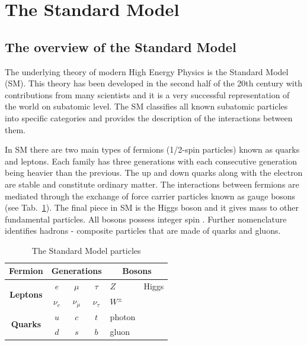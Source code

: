 \section{The Standard Model}
\label{SM}
\subsection{The overview of the Standard Model}
The underlying theory of modern High Energy Physics is the Standard Model (SM). This theory has been developed in the second half of the 20th century with contributions from many scientists and it is a very successful representation of the world on subatomic level.
The SM classifies all known subatomic particles into specific categories and provides the description of the interactions between them. 

In SM there are two main types of fermions (1/2-spin particles) known as quarks and leptons. Each family has three generations with each consecutive generation being heavier than the previous. The up and down quarks along with the electron are stable and constitute ordinary matter. The interactions between fermions are mediated through the exchange of force carrier particles known as gauge bosons (see Tab.~\ref{tab:SM}). The final piece in SM is the Higgs boson and it gives mass to other fundamental particles. All bosons possess integer spin \citep{martin2006nuclear}. Further nomenclature identifies hadrons - composite particles that are made of quarks and gluons. 
\begin{table}[]
\centering
\label{my-label}
\begin{tabular}{cccc | ll}
\textbf{Fermion}                  & \multicolumn{3}{c}{\textbf{Generations}} & \multicolumn{2}{c}{\textbf{Bosons}} \\ \hline
\multirow{2}{*}{\textbf{Leptons}} & $e$        & $\mu$        & $\tau$       & $Z$            & Higgs           \\
                                  & $\nu_{e}$  & $\nu_{\mu}$  & $\nu_{\tau}$ & $W^{\pm}$            &                 \\ 
\multirow{2}{*}{\textbf{Quarks}}  & $u$        & $c$          & $t$          & photon            &                 \\
                                  & $d$        & $s$          & $b$          & gluon             &          \\ \hline      
\end{tabular}
\caption{The Standard Model particles}
\label{tab:SM}
\end{table}


